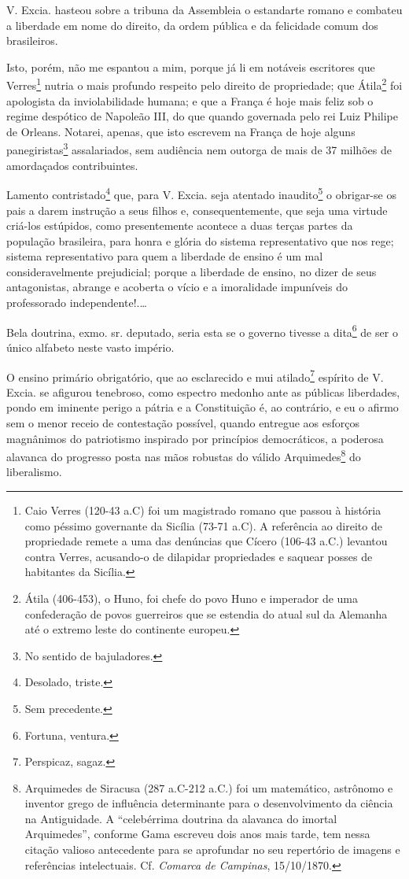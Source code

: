 V. Excia. hasteou sobre a tribuna da Assembleia o estandarte romano e
combateu a liberdade em nome do direito, da ordem pública e da
felicidade comum dos brasileiros.

Isto, porém, não me espantou a mim, porque já li em notáveis escritores
que Verres\footnote{Caio Verres (120-43 a.C) foi um magistrado romano
  que passou à história como péssimo governante da Sicília (73-71 a.C).
  A referência ao direito de propriedade remete a uma das denúncias que
  Cícero (106-43 a.C.) levantou contra Verres, acusando-o de dilapidar
  propriedades e saquear posses de habitantes da Sicília.} nutria o mais
profundo respeito pelo direito de propriedade; que Átila\footnote{
  Átila (406-453), o Huno, foi chefe do povo Huno e imperador de uma
  confederação de povos guerreiros que se estendia do atual sul da
  Alemanha até o extremo leste do continente europeu.} foi apologista da
inviolabilidade humana; e que a França é hoje mais feliz sob o regime
despótico de Napoleão III, do que quando governada pelo rei Luiz Philipe
de Orleans. Notarei, apenas, que isto escrevem na França de hoje alguns
panegiristas\footnote{No sentido de bajuladores.} assalariados, sem
audiência nem outorga de mais de 37 milhões de amordaçados
contribuintes.

Lamento contristado\footnote{Desolado, triste.} que, para V. Excia.
seja atentado inaudito\footnote{Sem precedente.} o obrigar-se os pais
a darem instrução a seus filhos e, consequentemente, que seja uma
virtude criá-los estúpidos, como presentemente acontece a duas terças
partes da população brasileira, para honra e glória do sistema
representativo que nos rege; sistema representativo para quem a
liberdade de ensino é um mal consideravelmente prejudicial; porque a
liberdade de ensino, no dizer de seus antagonistas, abrange e acoberta o
vício e a imoralidade impuníveis do professorado independente!.\ldots{}

Bela doutrina, exmo. sr. deputado, seria esta se o governo tivesse a
dita\footnote{Fortuna, ventura.} de ser o único alfabeto neste vasto
império.

O ensino primário obrigatório, que ao esclarecido e mui
atilado\footnote{Perspicaz, sagaz.} espírito de V. Excia. se afigurou
tenebroso, como espectro medonho ante as públicas liberdades, pondo em
iminente perigo a pátria e a Constituição é, ao contrário, e eu o afirmo
sem o menor receio de contestação possível, quando entregue aos esforços
magnânimos do patriotismo inspirado por princípios democráticos, a
poderosa alavanca do progresso posta nas mãos robustas do válido
Arquimedes\footnote{Arquimedes de Siracusa (287 a.C-212 a.C.) foi um
  matemático, astrônomo e inventor grego de influência determinante para
  o desenvolvimento da ciência na Antiguidade. A ``celebérrima doutrina
  da alavanca do imortal Arquimedes'', conforme Gama escreveu dois anos
  mais tarde, tem nessa citação valioso antecedente para se aprofundar
  no seu repertório de imagens e referências intelectuais. Cf.
  \emph{Comarca de Campinas}, 15/10/1870.} do liberalismo.

